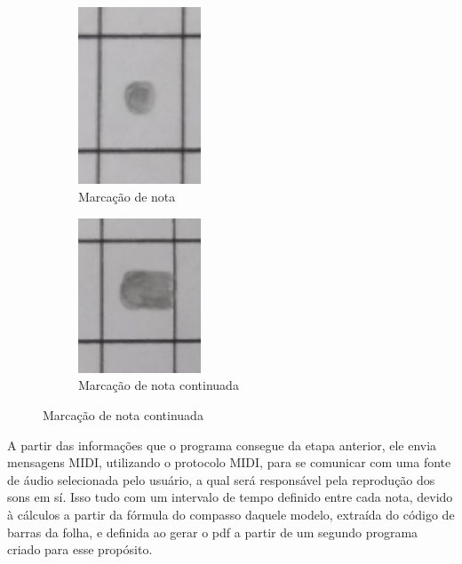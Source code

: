 \documentclass[12pt]{report}
\begin{document}
{\begin{figure}[H]
  \centering
  \begin{subfigure}{0.4\textwidth}
    \centering
    \includegraphics[width=0.4\textwidth]{imagens/nota.jpg}
    \caption{Marcação de nota}
    \label{fig:marcacao}
  \end{subfigure}
  \begin{subfigure}{0.4\textwidth}
    \centering
    \includegraphics[width=0.4\textwidth]{imagens/nota_continuada.jpeg}
    \caption{Marcação de nota continuada}
    \label{fig:marcacao_continuada}
  \end{subfigure}%
\end{figure}

A partir das informações que o programa consegue da etapa anterior, ele envia mensagens MIDI, utilizando o protocolo MIDI, para se comunicar com uma fonte de áudio selecionada pelo usuário, a qual será responsável pela reprodução dos sons em sí. Isso tudo com um intervalo de tempo definido entre cada nota, devido à cálculos a partir da fórmula do compasso daquele modelo, extraída do código de barras da folha, e definida ao gerar o pdf a partir de um segundo programa criado para esse propósito.

}
\end{document}
